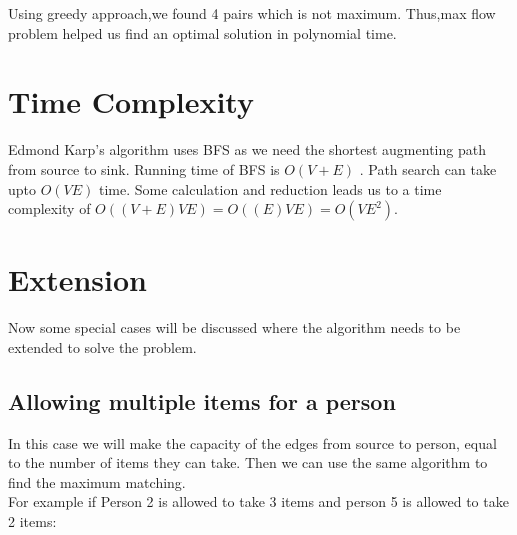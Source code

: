 \documentclass{article}
\begin{document}
        Using greedy approach,we found 4 pairs which is not maximum.\newline
        Thus,max flow problem helped us find an optimal solution in polynomial time.






\section{Time Complexity}
Edmond Karp's algorithm uses BFS as we need the shortest augmenting path from source to sink. Running time of BFS is $O(V + E)$ . Path search can take upto $O(V E)$ time. Some calculation and reduction leads us to a time complexity of $O((V+E)VE) = O((E)VE) = O(VE^{2})$.

\section{Extension}
Now some special cases will be discussed where the algorithm needs to be extended to solve the problem.

\newpage

\subsection{Allowing multiple items for a person}
In this case we will make the capacity of the edges  from source to person, equal to the number of items they can take. Then we can use the same algorithm to find the maximum matching. \\
For example if Person 2 is allowed to take 3 items and person 5 is allowed to take 2 items:
\end{document}
